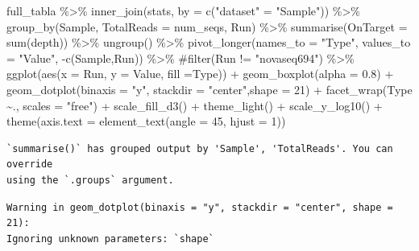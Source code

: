 \documentclass[
  letterpaper,
  DIV=11,
  numbers=noendperiod]{scrartcl}
\newenvironment{Shaded}{\begin{snugshade}}{\end{snugshade}}
\newcommand{\AttributeTok}[1]{\textcolor[rgb]{0.40,0.45,0.13}{#1}}
\newcommand{\CommentTok}[1]{\textcolor[rgb]{0.37,0.37,0.37}{#1}}
\newcommand{\DecValTok}[1]{\textcolor[rgb]{0.68,0.00,0.00}{#1}}
\newcommand{\FloatTok}[1]{\textcolor[rgb]{0.68,0.00,0.00}{#1}}
\newcommand{\FunctionTok}[1]{\textcolor[rgb]{0.28,0.35,0.67}{#1}}
\newcommand{\NormalTok}[1]{\textcolor[rgb]{0.00,0.23,0.31}{#1}}
\newcommand{\OtherTok}[1]{\textcolor[rgb]{0.00,0.23,0.31}{#1}}
\newcommand{\SpecialCharTok}[1]{\textcolor[rgb]{0.37,0.37,0.37}{#1}}
\newcommand{\StringTok}[1]{\textcolor[rgb]{0.13,0.47,0.30}{#1}}
\begin{document}
\begin{Shaded}
\begin{Highlighting}[]
\NormalTok{full\_tabla }\SpecialCharTok{\%\textgreater{}\%} \FunctionTok{inner\_join}\NormalTok{(stats, }\AttributeTok{by =} \FunctionTok{c}\NormalTok{(}\StringTok{"dataset"} \OtherTok{=} \StringTok{"Sample"}\NormalTok{)) }\SpecialCharTok{\%\textgreater{}\%} 
  \FunctionTok{group\_by}\NormalTok{(Sample, }\AttributeTok{TotalReads =}\NormalTok{ num\_seqs, Run) }\SpecialCharTok{\%\textgreater{}\%} 
  \FunctionTok{summarise}\NormalTok{(}\AttributeTok{OnTarget =} \FunctionTok{sum}\NormalTok{(depth)) }\SpecialCharTok{\%\textgreater{}\%} 
  \FunctionTok{ungroup}\NormalTok{() }\SpecialCharTok{\%\textgreater{}\%} 
  \FunctionTok{pivot\_longer}\NormalTok{(}\AttributeTok{names\_to =} \StringTok{"Type"}\NormalTok{, }\AttributeTok{values\_to =} \StringTok{"Value"}\NormalTok{, }\SpecialCharTok{{-}}\FunctionTok{c}\NormalTok{(Sample,Run)) }\SpecialCharTok{\%\textgreater{}\%} 
  \CommentTok{\#filter(Run != "novaseq694") \%\textgreater{}\% }
  \FunctionTok{ggplot}\NormalTok{(}\FunctionTok{aes}\NormalTok{(}\AttributeTok{x =}\NormalTok{ Run, }\AttributeTok{y =}\NormalTok{ Value, }\AttributeTok{fill =}\NormalTok{Type)) }\SpecialCharTok{+} 
  \FunctionTok{geom\_boxplot}\NormalTok{(}\AttributeTok{alpha =} \FloatTok{0.8}\NormalTok{) }\SpecialCharTok{+} 
  \FunctionTok{geom\_dotplot}\NormalTok{(}\AttributeTok{binaxis =} \StringTok{"y"}\NormalTok{, }\AttributeTok{stackdir =} \StringTok{"center"}\NormalTok{,}\AttributeTok{shape =} \DecValTok{21}\NormalTok{) }\SpecialCharTok{+}
  \FunctionTok{facet\_wrap}\NormalTok{(Type }\SpecialCharTok{\textasciitilde{}}\NormalTok{., }\AttributeTok{scales =} \StringTok{"free"}\NormalTok{) }\SpecialCharTok{+} 
  \FunctionTok{scale\_fill\_d3}\NormalTok{() }\SpecialCharTok{+}
  \FunctionTok{theme\_light}\NormalTok{() }\SpecialCharTok{+}
  \FunctionTok{scale\_y\_log10}\NormalTok{() }\SpecialCharTok{+}
  \FunctionTok{theme}\NormalTok{(}\AttributeTok{axis.text =} \FunctionTok{element\_text}\NormalTok{(}\AttributeTok{angle =} \DecValTok{45}\NormalTok{, }\AttributeTok{hjust =} \DecValTok{1}\NormalTok{))}
\end{Highlighting}
\end{Shaded}

\begin{verbatim}
`summarise()` has grouped output by 'Sample', 'TotalReads'. You can override
using the `.groups` argument.
\end{verbatim}

\begin{verbatim}
Warning in geom_dotplot(binaxis = "y", stackdir = "center", shape = 21):
Ignoring unknown parameters: `shape`
\end{verbatim}
\end{document}
